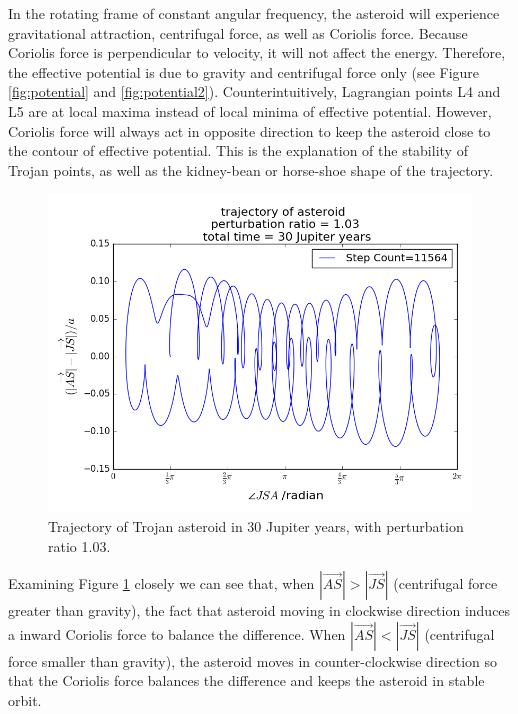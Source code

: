 \documentclass[12pt,a4paper]{article}
\begin{document}
In the rotating frame of constant angular frequency, the asteroid will experience gravitational attraction, centrifugal force, as well as Coriolis force. Because Coriolis force is perpendicular to velocity, it will not affect the energy. Therefore, the effective potential is due to gravity and centrifugal force only (see Figure \ref{fig:potential} and \ref{fig:potential2}). Counterintuitively, Lagrangian points L4 and L5 are at local maxima instead of local minima of effective potential. However, Coriolis force will always act in opposite direction to keep the asteroid close to the contour of effective potential. This is the explanation of the stability of Trojan points, as well as the kidney-bean or horse-shoe shape of the trajectory.


\begin{figure}[H]
\centering
\includegraphics[width=5.5in]{figure_4_103v_30orbits.png}
\caption{Trajectory of Trojan asteroid in 30 Jupiter years, with perturbation ratio 1.03.}
\label{fig:figure_4_103v_30orbits}
\end{figure}

Examining Figure \ref{fig:figure_4_103v_30orbits} closely we can see that, when $|\overrightarrow{AS}| > |\overrightarrow{JS}|$ (centrifugal force greater than gravity), the fact that asteroid moving in clockwise direction induces a inward Coriolis force to balance the difference. When $|\overrightarrow{AS}| < |\overrightarrow{JS}|$ (centrifugal force smaller than gravity), the asteroid moves in counter-clockwise direction so that the Coriolis force balances the difference and keeps the asteroid in stable orbit.
\end{document}
